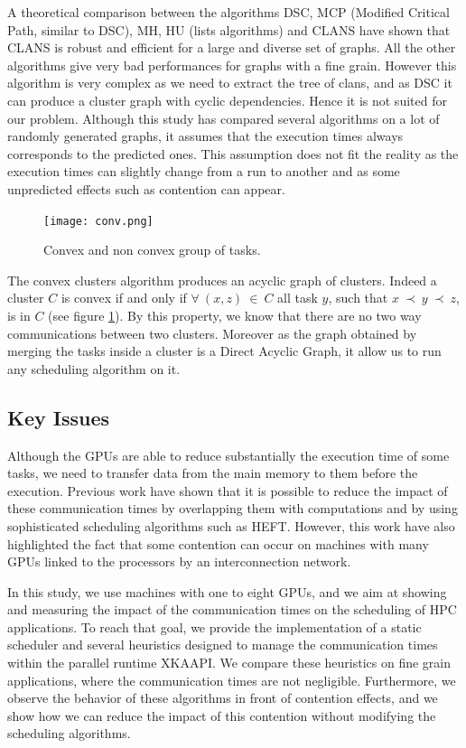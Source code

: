 \documentclass[10pt, conference, compsocconf,pdftex,dvipsnames]{IEEEtran}
\begin{document}
A theoretical comparison\cite{khan1994comparison} between the algorithms DSC,
MCP (Modified Critical Path, similar to DSC), MH, HU (lists algorithms) and
CLANS have shown that CLANS is robust and efficient for a large and diverse
set of graphs. All the other algorithms give very bad performances for graphs
with a fine grain. However this algorithm is very complex as we need to
extract the tree of clans, and as DSC it can produce a cluster graph with
cyclic dependencies. Hence it is not suited for our problem. Although this
study has compared several algorithms on a lot of randomly generated graphs,
it assumes that the execution times always corresponds to the predicted ones.
This assumption does not fit the reality as the execution times can
slightly change from a run to another and as some unpredicted effects such
as contention can appear. 

\begin{figure}[htb]
    \centering
    \texttt{[image: conv.png]}
    \caption{Convex and non convex group of tasks.}
    \label{fig:conv}
\end{figure}


The convex clusters algorithm\cite{lepere2002new} produces an acyclic graph
of clusters.  Indeed a cluster $C$ is convex if and only if $\forall\ (x,z)\
\in\ C$ all task $y$, such that $x\ \prec\ y\ \prec\ z$, is in $C$ (see
figure \ref{fig:conv}). By this property, we know that there are no two way
communications between two clusters. Moreover as the graph obtained by merging
the tasks inside a cluster is a Direct Acyclic Graph, it allow us to run
any scheduling algorithm on it.

\subsection{Key Issues}

Although the GPUs are able to reduce substantially the execution time of some
tasks, we need to transfer data from the main memory to them before the
execution. Previous work\cite{ferreiralima:hal-00735470} have shown that it is
possible to reduce the impact of these communication times by overlapping
them with computations and by using sophisticated scheduling algorithms such as
HEFT.  However, this work have also highlighted the fact that some contention
can occur on machines with many GPUs linked to the processors by an
interconnection network.

In this study, we use machines with one to eight GPUs, and we aim at showing
and measuring the impact of the communication times on the scheduling of HPC
applications. To reach that goal, we provide the implementation of  a static
scheduler and several heuristics designed to manage the communication times 
within the parallel runtime XKAAPI. We compare these heuristics on fine grain
applications, where the communication times are not negligible. Furthermore,
we observe the behavior of these algorithms in front of contention effects, and
we show how we can reduce the impact of this contention without modifying the
scheduling algorithms.
\end{document}
